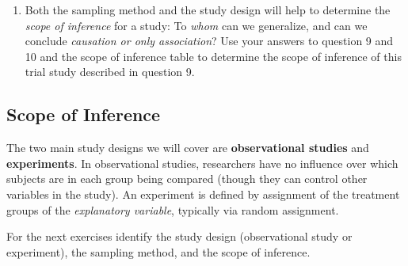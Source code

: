 \documentclass[
]{report}
\providecommand{\tightlist}{%
  \setlength{\itemsep}{0pt}\setlength{\parskip}{0pt}}
\begin{document}
\vspace{0.3in}

\begin{enumerate}
\def\labelenumi{\arabic{enumi}.}
\setcounter{enumi}{10}
\tightlist
\item
  Both the sampling method and the study design will help to determine the \emph{scope of inference} for a study: To \emph{whom} can we generalize, and can we conclude \emph{causation or only association}? Use your answers to question 9 and 10 and the scope of inference table to determine the scope of inference of this trial study described in question 9.
  \vspace{0.3in}
\end{enumerate}

\subsection{Scope of Inference}\label{scope-of-inference-2}

The two main study designs we will cover are \textbf{observational studies} and \textbf{experiments}. In observational studies, researchers have no influence over which subjects are in each group being compared (though they can control other variables in the study). An experiment is defined by assignment of the treatment groups of the \emph{explanatory variable}, typically via random assignment.

For the next exercises identify the study design (observational study or experiment), the sampling method, and the scope of inference.
\end{document}
